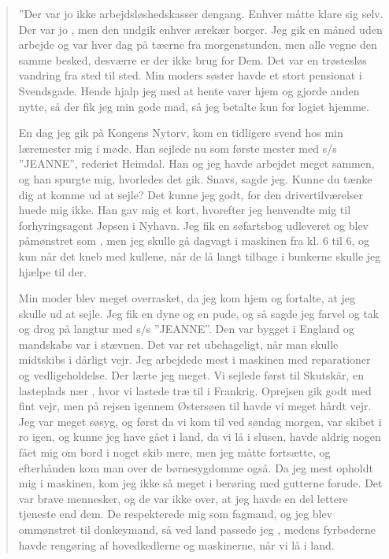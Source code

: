 \begin{quote}
''Der var jo ikke arbejdsløshedskasser dengang. Enhver måtte klare sig
    selv. Der var jo , men den undgik enhver ærekær
    borger. Jeg gik en måned uden arbejde og var hver dag på tæerne fra
    morgenstunden, men alle vegne den samme besked, desværre er der ikke
    brug for Dem. Det var en trøstesløs vandring fra sted til sted. Min
    moders søster havde et stort pensionat i Svendsgade. Hende hjalp jeg
    med at hente varer hjem og gjorde anden nytte, så der fik jeg min
    gode mad, så jeg betalte kun for logiet hjemme.
    
    En dag jeg gik på Kongens Nytorv, kom en tidligere svend hos min
    læremester mig i møde.  Han sejlede nu som første mester med s/s
    ''JEANNE'', rederiet Heimdal. Han og jeg havde arbejdet meget sammen,
    og han spurgte mig, hvorledes det gik. Snavs, sagde jeg. Kunne du
    tænke dig at komme ud at sejle? Det kunne jeg godt, for den
    drivertilværelser huede mig ikke. Han gav mig et kort, hvorefter jeg
    henvendte mig til forhyringsagent Jepsen i Nyhavn. Jeg fik en
    søfartsbog udleveret og blev påmønstret som , men
    jeg skulle gå dagvagt i maskinen fra kl. 6 til 6, og kun når det kneb
    med kullene, når de lå langt tilbage i bunkerne skulle jeg hjælpe til
    der.
    
    Min moder blev meget overrasket, da jeg kom hjem og fortalte, at jeg
    skulle ud at sejle. Jeg fik en dyne og en pude, og så sagde jeg
    farvel og tak og drog på langtur med s/s ''JEANNE''. Den var bygget i
    England og mandskabs var i stævnen. Det var ret
    ubehageligt, når man skulle midtskibs i dårligt vejr. Jeg arbejdede
    mest i maskinen med reparationer og vedligeholdelse.  Der lærte jeg
    meget. Vi sejlede først til Skutskär, en lasteplads nær
    , hvor
    vi lastede træ til  i Frankrig. Oprejsen gik godt med fint
    vejr, men på rejsen igennem Østersøen til  havde vi
    meget hårdt vejr. Jeg var meget søsyg, og først da vi kom til
     ved  søndag morgen, var skibet i ro igen, og
    kunne jeg have gået i land, da vi lå i slusen, havde aldrig nogen
    fået mig om bord i noget skib mere, men jeg måtte fortsætte, og
    efterhånden kom man over de børnesygdomme også. Da jeg mest opholdt
    mig i maskinen, kom jeg ikke så meget i berøring med gutterne forude.
    Det var brave mennesker, og de var ikke  over, at jeg havde
    en del lettere tjeneste end dem. De respekterede mig som fagmand, og
    jeg blev ommønstret til donkeymand, så
    ved land passede jeg , medens fyrbøderne havde rengøring
    af hovedkedlerne og maskinerne, når vi lå i land.
    

\end{quote}

